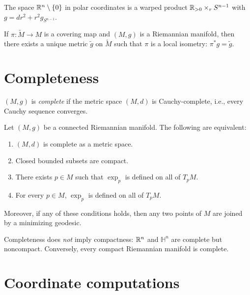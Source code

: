\begin{example}
The space $\mathbb{R}^n \setminus \{0\}$ in polar coordinates is a warped product
$\mathbb{R}_{>0} \times_r S^{n-1}$ with $g = dr^2 + r^2 g_{S^{n-1}}$.
\end{example}

\begin{proposition}
If $\pi : \widetilde{M} \to M$ is a covering map and $(M, g)$ is a Riemannian
manifold, then there exists a unique metric $\tilde{g}$ on $\widetilde{M}$
such that $\pi$ is a local isometry: $\pi^* g = \tilde{g}$.
\end{proposition}

\section{Completeness}

\begin{definition}
$(M, g)$ is \emph{complete} if the metric space $(M, d)$ is Cauchy-complete,
i.e., every Cauchy sequence converges.
\end{definition}

\begin{theorem}
\label{thm:hopf_rinow}
Let $(M, g)$ be a connected Riemannian manifold. The following are equivalent:
\begin{enumerate}
    \item $(M, d)$ is complete as a metric space.
    \item Closed bounded subsets are compact.
    \item There exists $p \in M$ such that $\exp_p$ is defined on all of $T_pM$.
    \item For every $p \in M$, $\exp_p$ is defined on all of $T_pM$.
\end{enumerate}
Moreover, if any of these conditions holds, then any two points of $M$ are
joined by a minimizing geodesic.
\end{theorem}

\begin{warning}[title=\textbf{Completeness vs.\ compactness}]
Completeness does \emph{not} imply compactness: $\mathbb{R}^n$ and $\mathbb{H}^n$ are
complete but noncompact. Conversely, every compact Riemannian manifold is complete.
\end{warning}

\section{Coordinate computations}

